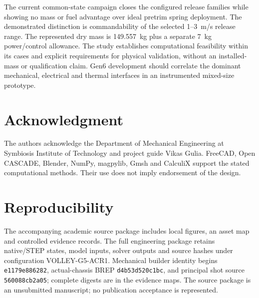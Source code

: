 \documentclass[conference,a4paper]{IEEEtran}
\begin{document}
The current common-state campaign closes the configured release families while showing no mass or fuel advantage over ideal pretrim spring deployment. The demonstrated distinction is commandability of the selected 1--3~m/s release range. The represented dry mass is 149.557~kg plus a separate 7~kg power/control allowance. The study establishes computational feasibility within its cases and explicit requirements for physical validation, without an installed-mass or qualification claim. Gen6 development should correlate the dominant mechanical, electrical and thermal interfaces in an instrumented mixed-size prototype.

\section*{Acknowledgment}
The authors acknowledge the Department of Mechanical Engineering at Symbiosis Institute of Technology and project guide Vikas Gulia. FreeCAD, Open CASCADE, Blender, NumPy, magpylib, Gmsh and CalculiX support the stated computational methods. Their use does not imply endorsement of the design.

\section*{Reproducibility}
The accompanying academic source package includes local figures, an asset map and controlled evidence records. The full engineering package retains native/STEP states, model inputs, solver outputs and source hashes under configuration VOLLEY-G5-ACR1. Mechanical builder identity begins \texttt{e1179e886282}, actual-chassis BREP \texttt{d4b53d520c1bc}, and principal shot source \texttt{560088cb2a05}; complete digests are in the evidence maps. The source package is an unsubmitted manuscript; no publication acceptance is represented.
\end{document}
